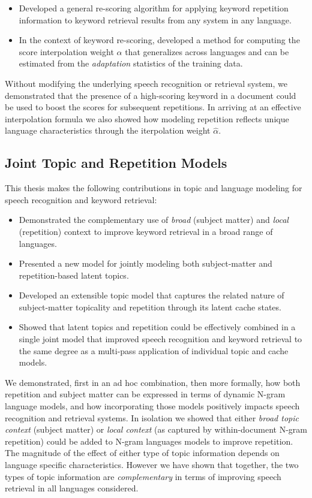 \begin{itemize}
\item Developed a general re-scoring algorithm for applying keyword repetition information to keyword retrieval results from any system in any language.
\item In the context of keyword re-scoring, developed a method for computing the score interpolation weight $\widehat{\alpha}$ that generalizes across languages and can be estimated from the \textit{adaptation} statistics of the training data.
\end{itemize}

Without modifying the underlying speech recognition or retrieval system, we demonstrated that the presence of a high-scoring keyword in a document could be used to boost the scores for subsequent repetitions.  In arriving at an effective interpolation formula we also showed how modeling repetition reflects unique language characteristics through the iterpolation weight $\widehat{\alpha}$.

\subsection{Joint Topic and Repetition Models}
This thesis makes the following contributions in topic and language modeling for speech recognition and keyword retrieval:

\begin{itemize}
\item Demonstrated the complementary use of \textit{broad} (subject matter) and \textit{local} (repetition) context to improve keyword retrieval in a broad range of languages.
\item Presented a new model for jointly modeling both subject-matter and repetition-based latent topics.  
\item Developed an extensible topic model that captures the related nature of subject-matter topicality and repetition through its latent cache states.
\item Showed that latent topics and repetition could be effectively combined in a single joint model that improved speech recognition and keyword retrieval to the same degree as a multi-pass application of individual topic and cache models.
\end{itemize}

We demonstrated, first in an ad hoc combination, then more formally, how both repetition and subject matter can be expressed in terms of dynamic N-gram language models, and how incorporating those models positively impacts speech recognition and retrieval systems.  In isolation we showed that either \textit{broad topic context} (subject matter) or \textit{local context} (as captured by within-document N-gram repetition) could be added to N-gram languages models to improve repetition.  The magnitude of the effect of either type of topic information depends on language specific characteristics.  However we have shown that together, the two types of topic information are \textit{complementary} in terms of improving speech retrieval in all languages considered.


